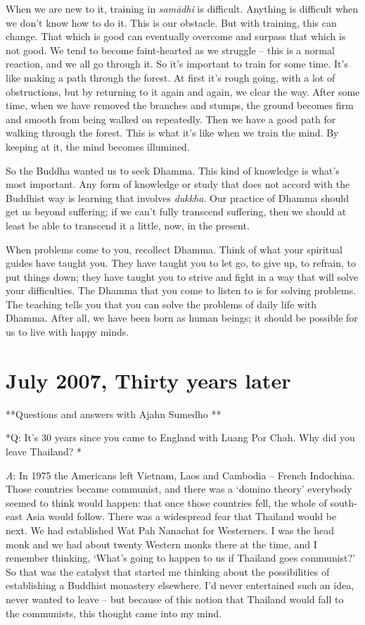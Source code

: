 When we are new to it, training in \emph{samādhi} is difficult. Anything
is difficult when we don't know how to do it. This is our obstacle. But
with training, this can change. That which is good can eventually
overcome and surpass that which is not good. We tend to become
faint-hearted as we struggle -- this is a normal reaction, and we all go
through it. So it's important to train for some time. It's like making a
path through the forest. At first it's rough going, with a lot of
obstructions, but by returning to it again and again, we clear the way.
After some time, when we have removed the branches and stumps, the
ground becomes firm and smooth from being walked on repeatedly. Then we
have a good path for walking through the forest. This is what it's like
when we train the mind. By keeping at it, the mind becomes illumined.

So the Buddha wanted us to seek Dhamma. This kind of knowledge is what's
most important. Any form of knowledge or study that does not accord with
the Buddhist way is learning that involves \emph{dukkha}. Our practice
of Dhamma should get us beyond suffering; if we can't fully transcend
suffering, then we should at least be able to transcend it a little,
now, in the present.

When problems come to you, recollect Dhamma. Think of what your
spiritual guides have taught you. They have taught you to let go, to
give up, to refrain, to put things down; they have taught you to strive
and fight in a way that will solve your difficulties. The Dhamma that
you come to listen to is for solving problems. The teaching tells you
that you can solve the problems of daily life with Dhamma. After all, we
have been born as human beings; it should be possible for us to live
with happy minds.

\chapter{July 2007, Thirty years later}

**Questions and answers with Ajahn Sumedho **

*Q: It's 30 years since you came to England with Luang Por Chah. Why did
you leave Thailand? *

\emph{A}: In 1975 the Americans left Vietnam, Laos and Cambodia --
French Indochina. Those countries became communist, and there was a
`domino theory' everybody seemed to think would happen: that once those
countries fell, the whole of south-east Asia would follow. There was a
widespread fear that Thailand would be next. We had established Wat Pah
Nanachat for Westerners. I was the head monk and we had about twenty
Western monks there at the time, and I remember thinking, `What's going
to happen to us if Thailand goes communist?' So that was the catalyst
that started me thinking about the possibilities of establishing a
Buddhist monastery elsewhere. I'd never entertained such an idea, never
wanted to leave -- but because of this notion that Thailand would fall
to the communists, this thought came into my mind.

